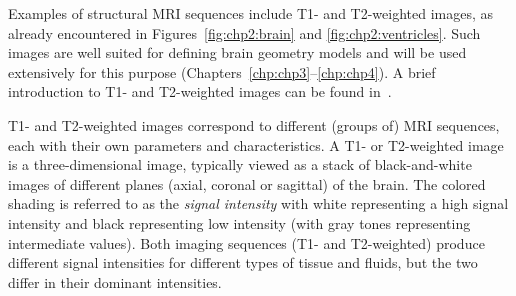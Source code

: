 Examples of structural MRI
sequences include T1- and T2-weighted images, as already
encountered in Figures~\ref{fig:chp2:brain} and
\ref{fig:chp2:ventricles}. Such images are well suited for defining
brain geometry models and will be used extensively for this purpose
(Chapters~\ref{chp:chp3}--\ref{chp:chp4}). A brief introduction to T1-
and T2-weighted images can be found in~\cite{pooley2005fundamental}.

T1- and T2-weighted images correspond to different (groups of) MRI
sequences, each with their own parameters and characteristics. A T1-
or T2-weighted image is a three-dimensional image, typically viewed as
a stack of black-and-white images of different planes (axial, coronal
or sagittal) of the brain. The colored shading is referred to as the
\emph{signal intensity} with white representing a high signal
intensity and black representing low intensity (with gray tones
representing intermediate values). Both imaging sequences (T1- and
T2-weighted) produce different signal intensities for different types of
tissue and fluids, but the two differ in their dominant intensities.

